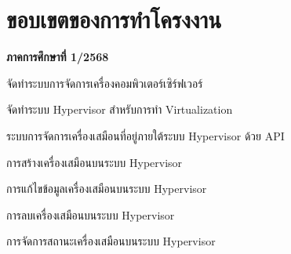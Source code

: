 \section{ขอบเขตของการทําโครงงาน} \label{sec1:scope}
\hspace*{1 cm}\textbf{ภาคการศึกษาที่ 1/2568}
\begin{mycustomenum2}
    \item จัดทำระบบการจัดการเครื่องคอมพิวเตอร์เซิร์ฟเวอร์
    \begin{mycustomenum2}
        \item จัดทำระบบ Hypervisor สำหรับการทำ Virtualization
        \item ระบบการจัดการเครื่องเสมือนที่อยู่ภายใต้ระบบ Hypervisor ด้วย API
        \begin{mycustomenum2}
            \item การสร้างเครื่องเสมือนบนระบบ Hypervisor
            \item การแก้ไขข้อมูลเครื่องเสมือนบนระบบ Hypervisor
            \item การลบเครื่องเสมือนบนระบบ Hypervisor
            \item การจัดการสถานะเครื่องเสมือนบนระบบ Hypervisor
        \end{mycustomenum2}
    \end{mycustomenum2}
    

\end{mycustomenum2}
